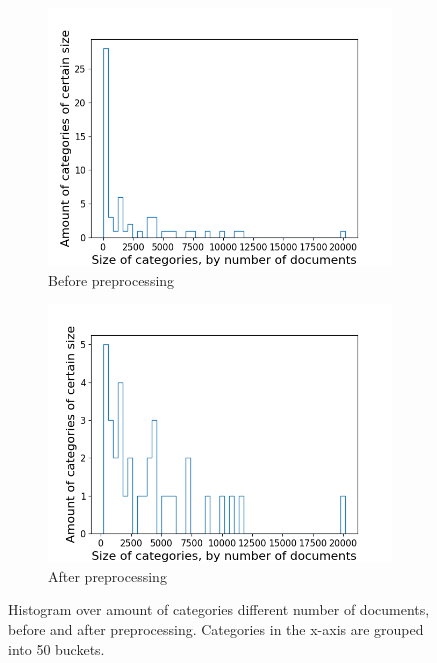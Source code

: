 \begin{figure}[ht]
	\centering
	\begin{subfigure}{0.45\textwidth}
		\centering
		\includegraphics[width=\linewidth]{figures/category_hist2_before.png}
		\caption{Before preprocessing}
		\label{fig:category_hist_before}
	\end{subfigure}
	\begin{subfigure}{0.45\textwidth}
		\centering
		\includegraphics[width=\linewidth]{figures/category_hist2_140.png}
		\caption{After preprocessing}
		\label{fig:category_hist_after}
	\end{subfigure}
	\caption{Histogram over amount of categories different number of documents, before and after preprocessing. Categories in the x-axis are grouped into 50 buckets.}
	\label{fig:category_hist}
\end{figure}


